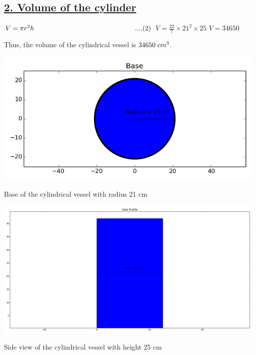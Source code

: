 \documentclass[journal,12pt,twocolumn]{IEEEtran}
\begin{document}
\subsection*{\underline{\textbf{2. Volume of the cylinder}}}
\newline
$V = \pi{r^2h}\hspace{5.25cm}....(2)$
\newline
$V = \frac{22}{7}\times21^2\times25$
\newline
$V = 34650$
\vspace{1mm}
\begin{center}
    {Thus, the volume of the cylindrical vessel is $34650 \hspace{1mm} cm^3.$}
\end{center}
\includegraphics[width = \columnwidth]{Figures/Base.png}
\begin{center}
Base of the cylindrical vessel with radius 21 cm
\end{center}
\includegraphics[width = \columnwidth]{Figures/Side Profile.png}
\begin{center}
Side view of the cylindrical vessel with height 25 cm
\end{center}
\vspace{7mm}
\end{document}
